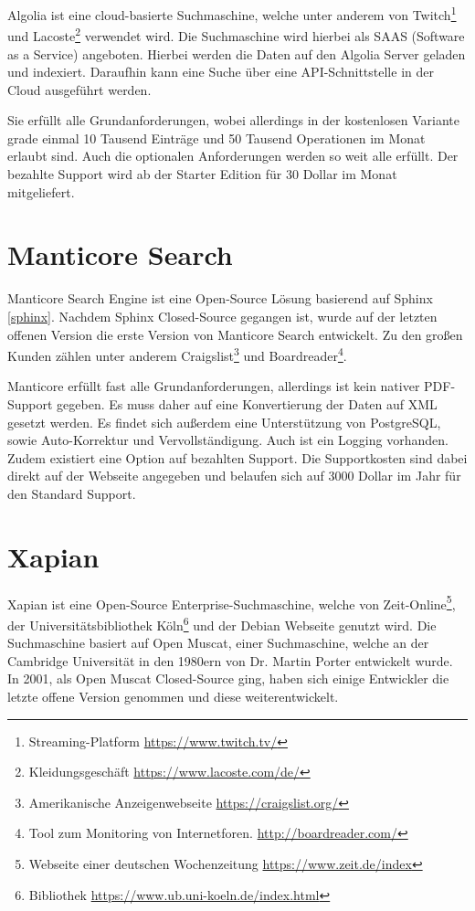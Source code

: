 Algolia ist eine cloud-basierte Suchmaschine, welche unter anderem von Twitch\footnote{Streaming-Platform \url{https://www.twitch.tv/}} und Lacoste\footnote{Kleidungsgeschäft \url{https://www.lacoste.com/de/}} verwendet wird. Die Suchmaschine wird hierbei als SAAS (Software as a Service) angeboten. Hierbei werden die Daten auf den Algolia Server geladen und indexiert. Daraufhin kann eine Suche über eine API-Schnittstelle in der Cloud ausgeführt werden.

Sie erfüllt alle Grundanforderungen, wobei allerdings in der kostenlosen Variante grade einmal 10 Tausend Einträge und 50 Tausend Operationen im Monat erlaubt sind. Auch die optionalen Anforderungen werden so weit alle erfüllt. Der bezahlte Support wird ab der Starter Edition für 30 Dollar im Monat mitgeliefert. \cite{Algolia.2019}

\section{Manticore Search}
\label{manticore}

Manticore Search Engine ist eine Open-Source Lösung basierend auf Sphinx \ref{sphinx}. Nachdem Sphinx Closed-Source gegangen ist, wurde auf der letzten offenen Version die erste Version von Manticore Search entwickelt. Zu den großen Kunden zählen unter anderem Craigslist\footnote{Amerikanische Anzeigenwebseite \url{https://craigslist.org/}} und Boardreader\footnote{Tool zum Monitoring von Internetforen. \url{http://boardreader.com/}}.

Manticore erfüllt fast alle Grundanforderungen, allerdings ist kein nativer PDF-Support gegeben. Es muss daher auf eine Konvertierung der Daten auf XML gesetzt werden. Es findet sich außerdem eine Unterstützung von PostgreSQL, sowie Auto-Korrektur und Vervollständigung. Auch ist ein Logging vorhanden. Zudem existiert eine Option auf bezahlten Support. Die Supportkosten sind dabei direkt auf der Webseite angegeben und belaufen sich auf 3000 Dollar im Jahr für den Standard Support. \cite{ManticoreSoftwareLtd.2019}

\section{Xapian}
\label{xapian}

Xapian ist eine Open-Source Enterprise-Suchmaschine, welche von Zeit-Online\footnote{Webseite einer deutschen Wochenzeitung \url{https://www.zeit.de/index}}, der Universitätsbibliothek Köln\footnote{Bibliothek \url{https://www.ub.uni-koeln.de/index.html}} und der Debian Webseite genutzt wird. Die Suchmaschine basiert auf Open Muscat, einer Suchmaschine, welche an der Cambridge Universität in den 1980ern von Dr. Martin Porter entwickelt wurde. In 2001, als Open Muscat Closed-Source ging, haben sich einige Entwickler die letzte offene Version genommen und diese weiterentwickelt.

